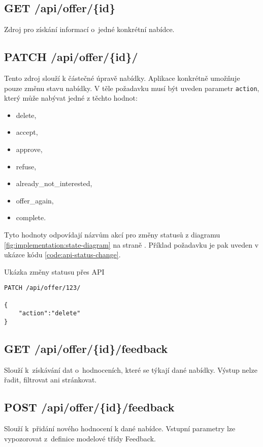 \subsection{GET /api/offer/\{id\}}
Zdroj pro získání informací o~jedné konkrétní nabídce.

\subsection{PATCH /api/offer/\{id\}/}
Tento zdroj slouží k částečné úpravě nabídky. Aplikace konkrétně umožňuje pouze změnu stavu nabídky. V těle požadavku musí být uveden parametr \texttt{action}, který může nabývat jedné z těchto hodnot:
\begin{itemize}
    \item delete,
    \item accept,
    \item approve,
    \item refuse,
    \item already\_not\_interested,
    \item offer\_again,
    \item complete.
\end{itemize}

Tyto hodnoty odpovídají názvům akcí pro změny statusů z diagramu \ref{fig:implementation:state-diagram} na straně \pageref{fig:implementation:state-diagram}. Příklad požadavku je pak uveden v ukázce kódu \ref{code:api-status-change}.

\begin{listing}[htbp]
\caption{\label{code:api-status-change}Ukázka změny statusu přes API}
\begin{verbatim}
PATCH /api/offer/123/

{
    "action":"delete"
}
\end{verbatim}
\end{listing}


\subsection{GET /api/offer/\{id\}/feedback}
Slouží k~získávání dat o~hodnoceních, které se týkají dané nabídky. Výstup nelze řadit, filtrovat ani stránkovat.

\subsection{POST /api/offer/\{id\}/feedback}
Slouží k~přidání nového hodnocení k dané nabídce. Vstupní parametry lze vypozorovat z~definice modelové třídy Feedback.

